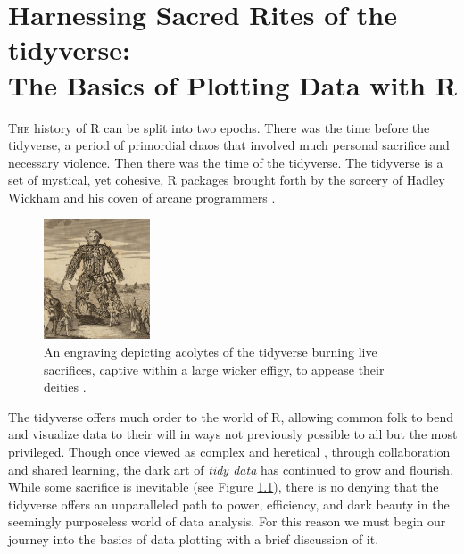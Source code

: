 \chapter[Harnessing Sacred Rites of the tidyverse: Plotting Basics]{Harnessing Sacred Rites of the tidyverse:\\ \huge The Basics of Plotting Data with R}

\lettrine{T}{he} history of R can be split into two epochs. There was the time before the tidyverse, a period of primordial chaos that involved much personal sacrifice and necessary violence. Then there was the time of the tidyverse. The tidyverse is a set of mystical, yet cohesive, R packages brought forth by the sorcery of Hadley Wickham and his coven of arcane programmers \parencite{Wickham2019}. 

\begin{figure}
  \begin{center}
    \includegraphics[width=0.28\textwidth]{graphics/ch2Figs/t_pennant.pdf}
  \end{center}
    \caption{An engraving depicting acolytes of the tidyverse burning live sacrifices, captive within a large wicker effigy, to appease their deities \parencite{Pennant1784}.}
    \label{fig:ch2_wicker}
\end{figure}


The tidyverse offers much order to the world of R, allowing common folk to bend and visualize data to their will in ways not previously possible to all but the most privileged. Though once viewed as complex and heretical \parencite{Muenchen}, through collaboration and shared learning, the dark art of \textit{tidy data} has continued to grow and flourish. While some sacrifice is inevitable (see Figure \ref{fig:ch2_wicker}), there is no denying that the tidyverse offers an unparalleled path to power, efficiency, and dark beauty in the seemingly purposeless world of data analysis. For this reason we must begin our journey into the basics of data plotting with a brief discussion of it.

